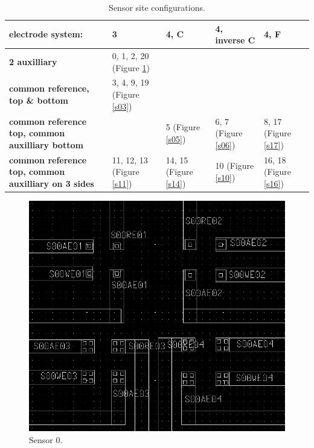 \begin{table}
	\begin{tabular}{p{4cm}|p{2cm}|p{2cm}|p{2.5cm}|p{2cm}}
		electrode system: & \textbf{3} & \textbf{4, C} & \textbf{4, inverse C} & \textbf{4, F} \\
		\hline
		\textbf{2 auxilliary} & 0, 1, 2, 20 (Figure \ref{s00}) & & & \\
		\hline
		\textbf{common reference, top \& bottom} & 3, 4, 9, 19 (Figure \ref{s03}) & & & \\
		\hline
		\textbf{common reference top, common auxilliary bottom} & & 5 (Figure \ref{s05}) & 6, 7 (Figure \ref{s06}) & 8, 17 (Figure \ref{s17}) \\
		\hline
		\textbf{common reference top, common auxilliary on 3 sides} & 11, 12, 13 (Figure \ref{s11}) & 14, 15 (Figure \ref{s14}) & 10 (Figure \ref{s10}) & 16, 18 (Figure \ref{s16})
	\end{tabular}
	\caption{Sensor site configurations.}
	\label{sensor-config}
\end{table}

\begin{figure}
	\centering
	\includegraphics[width=0.7\linewidth]{figures/s00.png}
	\caption{Sensor 0.}
	\label{s00}
\end{figure}

